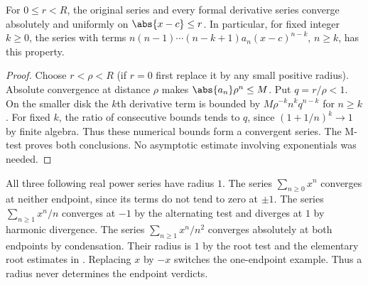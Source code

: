 \begin{theorem}
For $0\leq r<R$, the original series and every formal derivative series converge absolutely and uniformly on $\abs{x-c}\leq r$. In particular, for fixed integer $k\geq0$, the series with terms $n(n-1)\cdots(n-k+1)a_n(x-c)^{n-k}$, $n\geq k$, has this property.
\end{theorem}
\begin{proof}
Choose $r<\rho<R$ (if $r=0$ first replace it by any small positive radius). Absolute convergence at distance $\rho$ makes $\abs{a_n}\rho^n\leq M$. Put $q=r/\rho<1$. On the smaller disk the $k$th derivative term is bounded by $M\rho^{-k}n^kq^{n-k}$ for $n\geq k$. For fixed $k$, the ratio of consecutive bounds tends to $q$, since $(1+1/n)^k\to1$ by finite algebra. Thus these numerical bounds form a convergent series. The M-test proves both conclusions. No asymptotic estimate involving exponentials was needed.
\end{proof}

\begin{example}
All three following real power series have radius $1$. The series $\sum_{n\geq0}x^n$ converges at neither endpoint, since its terms do not tend to zero at $\pm1$. The series $\sum_{n\geq1}x^n/n$ converges at $-1$ by the alternating test and diverges at $1$ by harmonic divergence. The series $\sum_{n\geq1}x^n/n^2$ converges absolutely at both endpoints by condensation. Their radius is $1$ by the root test and the elementary root estimates in . Replacing $x$ by $-x$ switches the one-endpoint example. Thus a radius never determines the endpoint verdicts.
\end{example}

